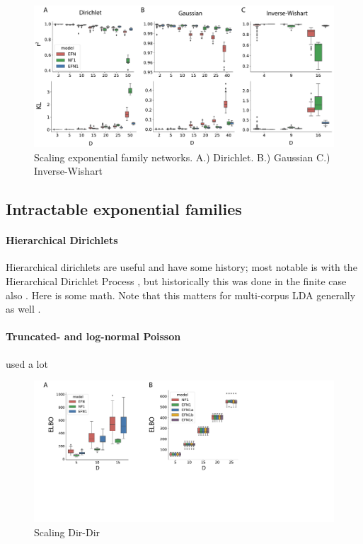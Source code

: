 \documentclass{article}
\begin{document}
 \begin{figure}
  \centering
\includegraphics[scale=0.46]{figs/fig3/fig3.pdf}
  \caption{Scaling exponential family networks.  A.) Dirichlet.  B.) Gaussian  C.) Inverse-Wishart}
\end{figure}

\subsection{Intractable exponential families}


\paragraph{Hierarchical Dirichlets}

Hierarchical dirichlets are useful and have some history; most notable is with the  Hierarchical Dirichlet Process \cite{teh2006hdp}, but historically this was done in the finite case also \cite{mackay1995hierarchical}.  Here is some math.    Note that this matters for multi-corpus LDA generally as well \cite{blei2003latent, pritchard2000inference}.


\paragraph{Truncated- and log-normal Poisson}

used a lot \cite{gao2016linear}\cite{adams2009tractable}\cite{cunningham2008fast,cunningham2008inferring}


 \begin{figure}
  \centering
\includegraphics[scale=0.46]{figs/fig4/fig4.pdf}
  \caption{Scaling Dir-Dir}
\end{figure}
\end{document}
